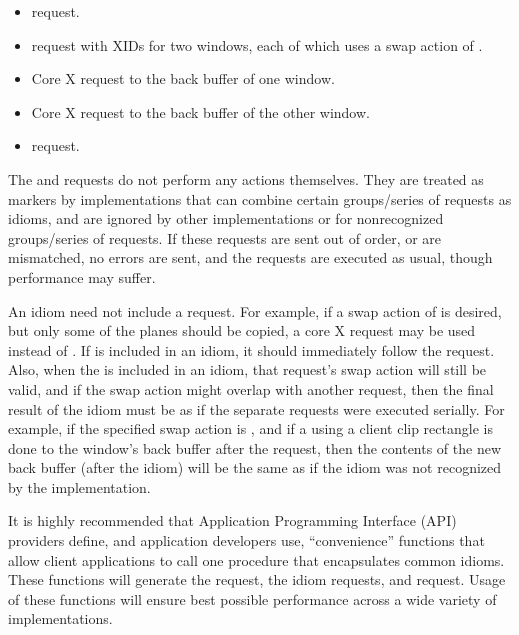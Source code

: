 \begin{itemize}
\item {} request.
\item {} request with XIDs for two windows, each
of which uses a swap action of .
\item Core X  request to the back buffer of one window.
\item Core X  request to the back buffer of the other window.
\item {} request.
\end{itemize}

The  and  requests
do not perform any actions themselves.  They are treated as markers by
implementations that can combine certain groups/series of requests as
idioms, and are ignored by other implementations or for nonrecognized
groups/series of requests.  If these requests are sent out of order,
or are mismatched, no errors are sent, and the requests are executed
as usual, though performance may suffer.

An idiom need not include a  request.  For
example, if a swap action of  is desired, but only some of the
planes should be copied, a core X  request may
be used instead of .  If
 is included in an idiom, it should
immediately follow the  request.  Also,
when the  is included in an idiom, that
request's swap action will still be valid, and if the swap action
might overlap with another request, then the final result of the idiom
must be as if the separate requests were executed serially.  For
example, if the specified swap action is , and if a
 using a client clip rectangle is done
to the window's back buffer after the 
request, then the contents of the new back buffer (after the idiom)
will be the same as if the idiom was not recognized by the
implementation.

It is highly recommended that Application Programming Interface (API) 
providers define, and application developers use, ``convenience'' functions 
that allow client applications to call one procedure that encapsulates common idioms.
These functions will generate the  request,
the idiom requests, and  request.  Usage of
these functions will ensure best possible performance across a wide
variety of implementations.

